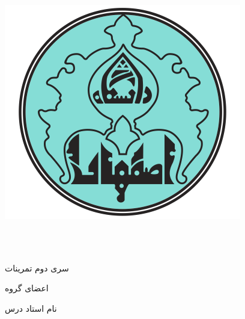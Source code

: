 \documentclass[11pt]{article}
\begin{document}


\begin{center}

    \includegraphics[scale=0.2]{./UILogo.png}

    \University \\
    \Department\\


    \begin{large}
        \vspace{0.5cm}

    \end{large}

    \vspace{1cm}
    \begin{latin}
        {\Large\textbf\EnglishCourseTitle}
    \end{latin}
    \begin{center}
        \CourseName
    \end{center}

    \vspace{1cm}
    {\large{سری دوم تمرینات}}\\
    \vspace{0.25cm}
    {\large\textbf{\courseSemester}}

    \vspace{1.25cm}

    {اعضای گروه}\\
    \begin{spacing}{1.5}
        {{\GroupeMembers}}
    \end{spacing}

    \vspace{1.25cm}


    \vspace{0.5cm}
    {نام استاد درس}\\[0.5em]
    {\large\textbf{\CourseProfessor}}

    \vspace{1.2cm}

\end{center}
\pagebreak
\end{document}
